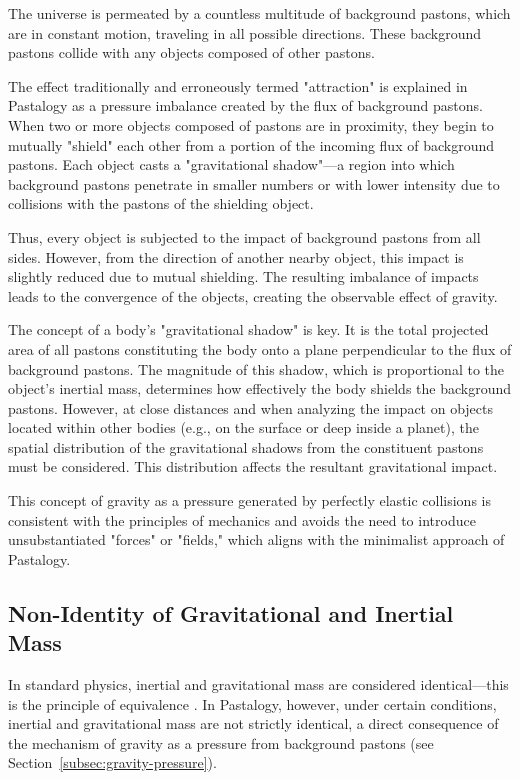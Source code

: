 \documentclass[pdflatex,sn-mathphys-num]{sn-jnl}
\begin{document}
The universe is permeated by a countless multitude of background pastons, which are in constant motion, traveling in all possible directions. These background pastons collide with any objects composed of other pastons.

The effect traditionally and erroneously termed "attraction" is explained in Pastalogy as a pressure imbalance created by the flux of background pastons. When two or more objects composed of pastons are in proximity, they begin to mutually "shield" each other from a portion of the incoming flux of background pastons. Each object casts a "gravitational shadow"---a region into which background pastons penetrate in smaller numbers or with lower intensity due to collisions with the pastons of the shielding object.

Thus, every object is subjected to the impact of background pastons from all sides. However, from the direction of another nearby object, this impact is slightly reduced due to mutual shielding. The resulting imbalance of impacts leads to the convergence of the objects, creating the observable effect of gravity.

The concept of a body's "gravitational shadow" is key. It is the total projected area of all pastons constituting the body onto a plane perpendicular to the flux of background pastons. The magnitude of this shadow, which is proportional to the object's inertial mass, determines how effectively the body shields the background pastons. However, at close distances and when analyzing the impact on objects located within other bodies (e.g., on the surface or deep inside a planet), the spatial distribution of the gravitational shadows from the constituent pastons must be considered. This distribution affects the resultant gravitational impact.

This concept of gravity as a pressure generated by perfectly elastic collisions is consistent with the principles of mechanics and avoids the need to introduce unsubstantiated "forces" or "fields," which aligns with the minimalist approach of Pastalogy.

\subsection{Non-Identity of Gravitational and Inertial Mass}\label{subsec:mass-nonequivalence}

In standard physics, inertial and gravitational mass are considered identical---this is the principle of equivalence \cite{einstein1920-relativity}. In Pastalogy, however, under certain conditions, inertial and gravitational mass are not strictly identical, a direct consequence of the mechanism of gravity as a pressure from background pastons (see Section~\ref{subsec:gravity-pressure}).
\end{document}
